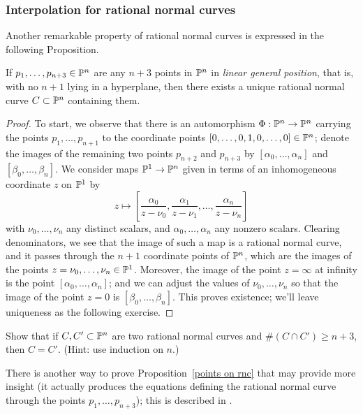 \subsubsection{Interpolation for rational normal curves}

Another remarkable property of rational normal curves is expressed in the following Proposition.


\begin{proposition}\label{points on rnc}
If $p_1,\dots, p_{n+3} \in {\mathbb P}^n$ are any $n+3$ points in ${\mathbb P}^n$ in \emph{linear general position}, that is, with no $n+1$ lying in a hyperplane, then there exists a unique rational normal curve $C \subset {\mathbb P}^n$ containing them.
 \end{proposition}

\begin{proof}
To start, we observe that there is an automorphism $\Phi : {\mathbb P}^n \to {\mathbb P}^n$ carrying the points $p_1,\dots,p_{n+1}$ to the coordinate points $[0,\dots,0,1,0,\dots,0] \in {\mathbb P}^n$; denote the images of the remaining two points $p_{n+2}$ and $p_{n+3}$ by $[\alpha_0,\dots,\alpha_n]$ and $[\beta_0,\dots,\beta_n]$. We consider maps ${\mathbb P}^1 \to {\mathbb P}^n$ given in terms of an inhomogeneous coordinate $z$ on ${\mathbb P}^1$ by
$$
z \mapsto \left[ \frac{\alpha_0}{z - \nu_0}, \frac{\alpha_1}{z - \nu_1} , \dots, \frac{\alpha_n}{z - \nu_n}  \right]
$$
with $\nu_0,\dots,\nu_n$ any distinct scalars, and $\alpha_0,\dots,\alpha_n$ any nonzero  scalars. Clearing denominators, we see that the image of such a map is a rational normal curve, and it passes through the $n+1$ coordinate points of ${\mathbb P}^n$, which are the images of the points $z = \nu_0, \dots, \nu_n \in {\mathbb P}^1$. Moreover, the image of the point $z = \infty$ at infinity is the point $[\alpha_0,\dots,\alpha_n]$; and we can adjust the values of $\nu_0,\dots,\nu_n$ so that the image of the point $z = 0$ is $[\beta_0,\dots,\beta_n]$. This proves existence; we'll leave uniqueness as the following exercise. 
\end{proof}

\begin{exercise}
Show that if $C, C' \subset {\mathbb P}^n$ are two rational normal curves and $\#(C \cap C') \geq n+3$, then $C = C'$. (Hint: use induction on $n$.)
\end{exercise}

There is another way to prove Proposition~\ref{points on rnc} that may provide more insight (it actually produces the equations defining the rational normal curve through the points $p_1,\dots,p_{n+3}$); this is described in \cite{Montreal}. 

